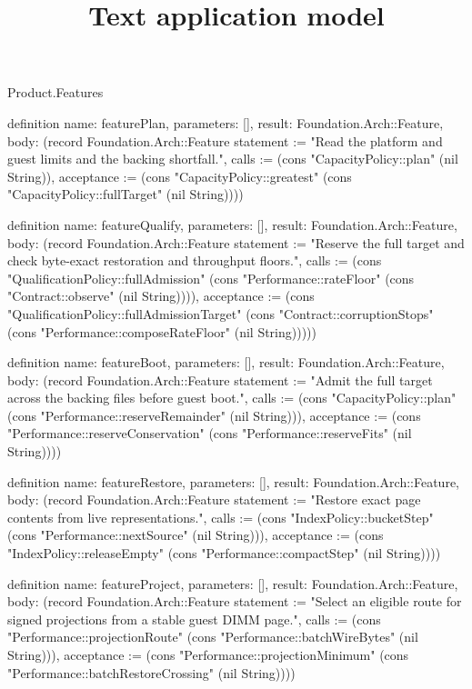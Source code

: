 \begin{lexlean}{Product.Features}
\title{Text application model}
\begin{semanticmodule}
definition{
  name: featurePlan, parameters: [], result: Foundation.Arch::Feature,
  body: (record Foundation.Arch::Feature {statement := "Read the platform and guest limits and the backing shortfall.", calls := (cons "CapacityPolicy::plan" (nil String)), acceptance := (cons "CapacityPolicy::greatest" (cons "CapacityPolicy::fullTarget" (nil String)))})
}

definition{
  name: featureQualify, parameters: [], result: Foundation.Arch::Feature,
  body: (record Foundation.Arch::Feature {statement := "Reserve the full target and check byte-exact restoration and throughput floors.", calls := (cons "QualificationPolicy::fullAdmission" (cons "Performance::rateFloor" (cons "Contract::observe" (nil String)))), acceptance := (cons "QualificationPolicy::fullAdmissionTarget" (cons "Contract::corruptionStops" (cons "Performance::composeRateFloor" (nil String))))})
}

definition{
  name: featureBoot, parameters: [], result: Foundation.Arch::Feature,
  body: (record Foundation.Arch::Feature {statement := "Admit the full target across the backing files before guest boot.", calls := (cons "CapacityPolicy::plan" (cons "Performance::reserveRemainder" (nil String))), acceptance := (cons "Performance::reserveConservation" (cons "Performance::reserveFits" (nil String)))})
}

definition{
  name: featureRestore, parameters: [], result: Foundation.Arch::Feature,
  body: (record Foundation.Arch::Feature {statement := "Restore exact page contents from live representations.", calls := (cons "IndexPolicy::bucketStep" (cons "Performance::nextSource" (nil String))), acceptance := (cons "IndexPolicy::releaseEmpty" (cons "Performance::compactStep" (nil String)))})
}

definition{
  name: featureProject, parameters: [], result: Foundation.Arch::Feature,
  body: (record Foundation.Arch::Feature {statement := "Select an eligible route for signed projections from a stable guest DIMM page.", calls := (cons "Performance::projectionRoute" (cons "Performance::batchWireBytes" (nil String))), acceptance := (cons "Performance::projectionMinimum" (cons "Performance::batchRestoreCrossing" (nil String)))})
}


\end{semanticmodule}
\end{lexlean}
